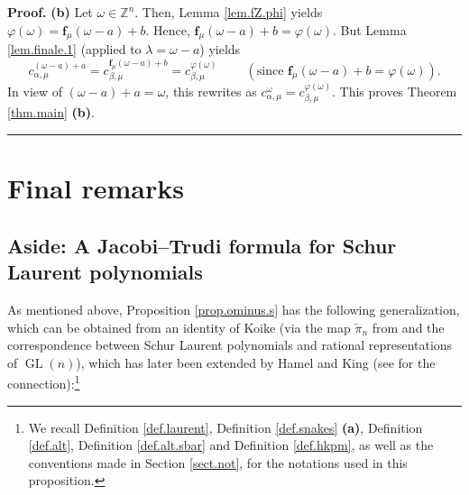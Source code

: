 \documentclass[numbers=enddot,12pt,final,onecolumn,notitlepage]{scrartcl}%
\theoremstyle{definition}
\newenvironment{proof}[1][Proof]{\noindent\textbf{#1.} }{\ \rule{0.5em}{0.5em}}
\begin{document}
\begin{proof}
\textbf{(b)} Let $\omega\in\mathbb{Z}^{n}$. Then, Lemma \ref{lem.fZ.phi}
yields $\varphi\left(  \omega\right)  =\mathbf{f}_{\mu}\left(  \omega
-a\right)  +b$. Hence, $\mathbf{f}_{\mu}\left(  \omega-a\right)
+b=\varphi\left(  \omega\right)  $. But Lemma \ref{lem.finale.1} (applied to
$\lambda=\omega-a$) yields%
\[
c_{\alpha,\mu}^{\left(  \omega-a\right)  +a}=c_{\beta,\mu}^{\mathbf{f}_{\mu
}\left(  \omega-a\right)  +b}=c_{\beta,\mu}^{\varphi\left(  \omega\right)
}\ \ \ \ \ \ \ \ \ \ \left(  \text{since }\mathbf{f}_{\mu}\left(
\omega-a\right)  +b=\varphi\left(  \omega\right)  \right)  .
\]
In view of $\left(  \omega-a\right)  +a=\omega$, this rewrites as
$c_{\alpha,\mu}^{\omega}=c_{\beta,\mu}^{\varphi\left(  \omega\right)  }$. This
proves Theorem \ref{thm.main} \textbf{(b)}.
\end{proof}

\section{\label{sect.fin}Final remarks}

\subsection{\label{subsect.fin.jt}Aside: A Jacobi--Trudi formula for Schur
Laurent polynomials}

As mentioned above, Proposition \ref{prop.ominus.s} has the following
generalization, which can be obtained from an identity of Koike
\cite[Proposition 2.8]{Koike89} (via the map $\widetilde{\pi}_{n}$ from
\cite{Koike89} and the correspondence between Schur Laurent polynomials and
rational representations of $\operatorname{GL}\left(  n\right)  $), which has
later been extended by Hamel and King \cite{HamKin11} (see \cite[(6) and
(10)]{HamKin11} for the connection):\footnote{We recall Definition
\ref{def.laurent}, Definition \ref{def.snakes} \textbf{(a)}, Definition
\ref{def.alt}, Definition \ref{def.alt.sbar} and Definition \ref{def.hkpm}, as
well as the conventions made in Section \ref{sect.not}, for the notations used
in this proposition.}
\end{document}
